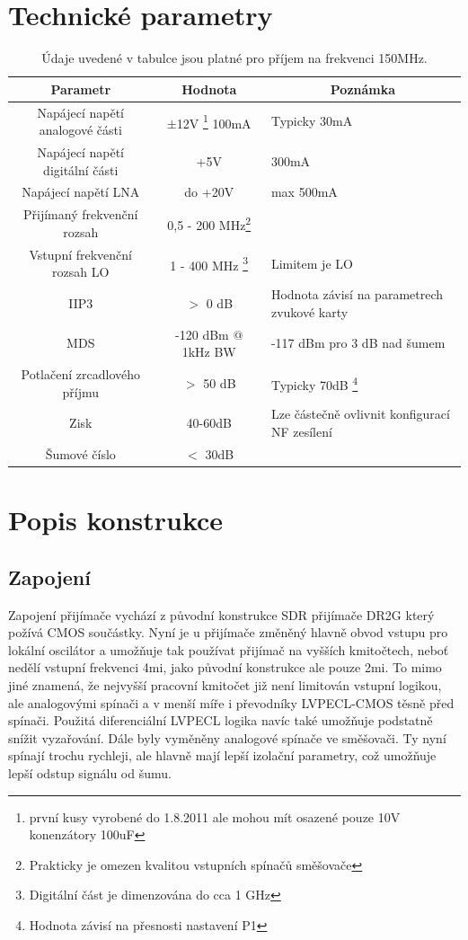 \documentclass[12pt,a4paper,oneside]{article}
\begin{document}
\section{Technické parametry}
\begin{savenotes}
\begin{table}[htbp]
\begin{center}
\begin{tabular}{|c|c|p{5cm}|}
\hline
Parametr & Hodnota & \multicolumn{1}{|c|}{Poznámka} \\
\hline
Napájecí napětí analogové části & $\pm$12V \footnote{první kusy vyrobené do 1.8.2011 ale mohou mít osazené pouze 10V konenzátory 100uF} 100mA &  Typicky 30mA \\ \hline
Napájecí napětí digitální části & +5V &  300mA \\ \hline
Napájecí napětí LNA & do +20V &  max 500mA \\ \hline
Přijímaný frekvenční rozsah  & 0,5 - 200 MHz\footnote{Prakticky je omezen kvalitou vstupních spínačů směšovače} &  \\ \hline
Vstupní frekvenční rozsah LO  & 1 - 400 MHz \footnote{Digitální část je dimenzována do cca 1 GHz} & Limitem je LO  \\ \hline
IIP3  & $>$ 0 dB & Hodnota závisí na parametrech zvukové karty \\ \hline
MDS  & -120 dBm @ 1kHz BW & -117 dBm pro 3 dB nad šumem  \\ \hline
Potlačení zrcadlového příjmu   & $>$ 50 dB & Typicky 70dB \footnote{Hodnota závisí na přesnosti nastavení P1}\\ \hline
Zisk & 40-60dB & Lze částečně ovlivnit konfigurací NF zesílení\\ \hline
Šumové číslo  & $<$ 30dB & \\ \hline
\end{tabular}
\caption{Údaje uvedené v tabulce jsou platné pro příjem na frekvenci 150MHz.}
\label{Technicke_parametry}
\end{center}
\end{table}
\end{savenotes}

\newpage
\section{Popis konstrukce}

\subsection{Zapojení}
Zapojení přijímače vychází z původní konstrukce SDR přijímače DR2G \cite{DR2G}  který požívá CMOS součástky. Nyní je u přijímače změněný hlavně obvod vstupu pro lokální oscilátor a umožňuje tak používat přijímač na vyšších kmitočtech, neboť nedělí vstupní frekvenci 4mi, jako původní konstrukce ale pouze 2mi. To mimo jiné znamená, že nejvyšší pracovní kmitočet již není limitován vstupní logikou, ale analogovými spínači a v menší míře i převodníky LVPECL-CMOS těsně před spínači. Použitá diferenciální LVPECL logika navíc také umožňuje podstatně snížit vyzařování. Dále byly vyměněny analogové spínače ve směšovači. Ty nyní spínají trochu rychleji, ale hlavně mají lepší izolační parametry, což umožňuje lepší odstup signálu od šumu.
\end{document}
